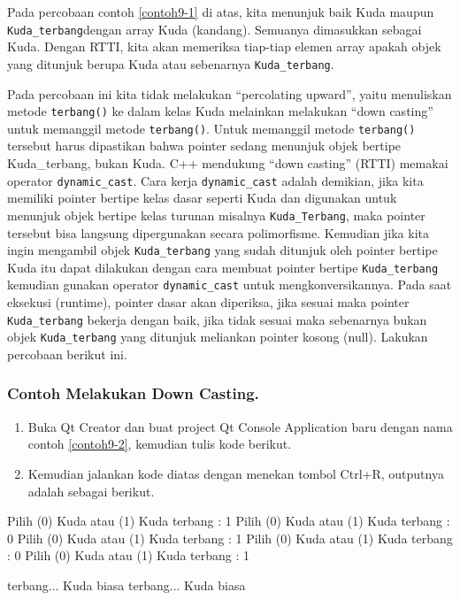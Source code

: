 Pada percobaan contoh \ref{contoh9-1} di atas, kita menunjuk baik Kuda maupun
\texttt{Kuda\_terbang}dengan array Kuda (kandang). Semuanya dimasukkan
sebagai Kuda. Dengan RTTI, kita akan memeriksa tiap-tiap elemen array
apakah objek yang ditunjuk berupa Kuda atau sebenarnya
\texttt{Kuda\_terbang}.

Pada percobaan ini kita tidak melakukan ``percolating upward'', yaitu
menuliskan metode \texttt{terbang()} ke dalam kelas Kuda melainkan
melakukan ``down casting'' untuk memanggil metode \texttt{terbang()}.
Untuk memanggil metode \texttt{terbang()} tersebut harus dipastikan
bahwa pointer sedang menunjuk objek bertipe Kuda\_terbang, bukan Kuda.
C++ mendukung ``down casting'' (RTTI) memakai operator
\texttt{dynamic\_cast}. Cara kerja \texttt{dynamic\_cast} adalah
demikian, jika kita memiliki pointer bertipe kelas dasar seperti Kuda
dan digunakan untuk menunjuk objek bertipe kelas turunan misalnya
\texttt{Kuda\_Terbang}, maka pointer tersebut bisa langsung dipergunakan
secara polimorfisme. Kemudian jika kita ingin mengambil objek
\texttt{Kuda\_terbang} yang sudah ditunjuk oleh pointer bertipe Kuda itu
dapat dilakukan dengan cara membuat pointer bertipe
\texttt{Kuda\_terbang} kemudian gunakan operator \texttt{dynamic\_cast}
untuk mengkonversikannya. Pada saat eksekusi (runtime), pointer dasar
akan diperiksa, jika sesuai maka pointer \texttt{Kuda\_terbang} bekerja
dengan baik, jika tidak sesuai maka sebenarnya bukan objek
\texttt{Kuda\_terbang} yang ditunjuk meliankan pointer kosong (null).
Lakukan percobaan berikut ini.

\subsubsection*{Contoh  Melakukan Down Casting.}

\begin{enumerate}

\item
  Buka Qt Creator dan buat project Qt Console Application baru dengan
  nama contoh \ref{contoh9-2}, kemudian tulis kode berikut.




\item
  Kemudian jalankan kode diatas dengan menekan tombol Ctrl+R, outputnya
  adalah sebagai berikut.
\end{enumerate}

\begin{lcverbatim}
Pilih (0) Kuda atau (1) Kuda terbang : 1
Pilih (0) Kuda atau (1) Kuda terbang : 0
Pilih (0) Kuda atau (1) Kuda terbang : 1
Pilih (0) Kuda atau (1) Kuda terbang : 0
Pilih (0) Kuda atau (1) Kuda terbang : 1

terbang...
Kuda biasa
terbang...
Kuda biasa
\end{lcverbatim}

